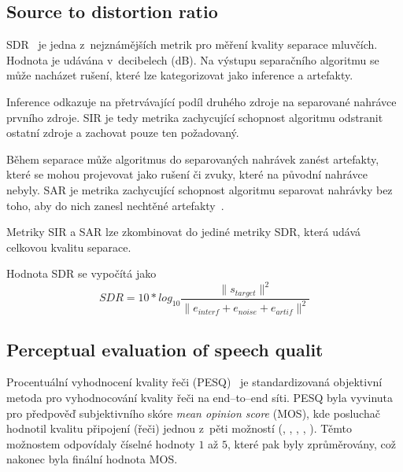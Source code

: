 \subsection{Source to distortion ratio}
SDR~\cite{vincent-inria-00544230} je jedna z~nejznámějších metrik pro měření kvality separace mluvčích. Hodnota je udávána v~decibelech (dB). Na výstupu separačního algoritmu se může nacházet rušení, které lze kategorizovat jako inference a artefakty. 

Inference odkazuje na přetrvávající podíl druhého zdroje na separované nahrávce prvního zdroje. SIR je tedy metrika zachycující schopnost algoritmu odstranit ostatní zdroje a zachovat pouze ten požadovaný.

Během separace může algoritmus do separovaných nahrávek zanést artefakty, které se mohou projevovat jako rušení či zvuky, které na původní nahrávce nebyly. SAR je metrika zachycující schopnost algoritmu separovat nahrávky bez toho, aby do nich zanesl nechtěné artefakty~\cite{venkataramani2018performance}.

Metriky SIR a SAR lze zkombinovat do jediné metriky SDR, která udává celkovou kvalitu separace. 

Hodnota SDR se vypočítá jako 
\begin{equation}
  SDR = 10*log_{10}\frac{\|s_{target}\|^2}{\|e_{interf} + e_{noise} + e_{artif}\|^2}
\end{equation}




\subsection{Perceptual evaluation of speech qualit}
Procentuální vyhodnocení kvality řeči (PESQ)~\cite{pesq-itut} je standardizovaná objektivní metoda pro vyhodnocování kvality řeči na end--to--end síti. PESQ byla vyvinuta pro předpověď subjektivního skóre \textit{mean opinion score} (MOS), kde posluchač hodnotil kvalitu připojení (řeči) jednou z~pěti možností (, , , , ). Těmto možnostem odpovídaly číselné hodnoty $1$ až $5$, které pak byly zprůměrovány, což nakonec byla finální hodnota MOS.

